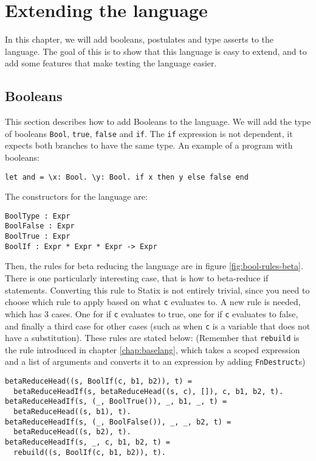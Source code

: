 \chapter{\label{chap:bools}Extending the language}

In this chapter, we will add booleans, postulates and type asserts to the language. The goal of this is to show that this language is easy to extend, and to add some features that make testing the language easier.

\section{Booleans}

This section describes how to add Booleans to the language. We will add the type of booleans \verb|Bool|, \verb|true|, \verb|false| and \verb|if|. The \verb|if| expression is not dependent, it expects both branches to have the same type. An example of a program with booleans: 

\begin{lstlisting}
let and = \x: Bool. \y: Bool. if x then y else false end
\end{lstlisting}
The constructors for the language are:

\begin{lstlisting}
BoolType : Expr
BoolFalse : Expr
BoolTrue : Expr
BoolIf : Expr * Expr * Expr -> Expr
\end{lstlisting}
Then, the rules for beta reducing the language are in figure \ref{fig:bool-rules-beta}. There is one particularly interesting case, that is how to beta-reduce if statements. Converting this rule to Statix is not entirely trivial, since you need to choose which rule to apply based on what \verb|c| evaluates to. A new rule is needed, which has 3 cases. One for if \verb|c| evaluates to true, one for if \verb|c| evaluates to false, and finally a third case for other cases (such as when \verb|c| is a variable that does not have a substitution). These rules are stated below: (Remember that \verb|rebuild| is the rule introduced in chapter \ref{chap:baselang}, which takes a scoped expression and a list of arguments and converts it to an expression by adding \verb|FnDestruct|s)

\begin{lstlisting}
betaReduceHead((s, BoolIf(c, b1, b2)), t) = 
  betaReduceHeadIf(s, betaReduceHead((s, c), []), c, b1, b2, t).
betaReduceHeadIf(s, (_, BoolTrue()), _, b1, _, t) = 
  betaReduceHead((s, b1), t).
betaReduceHeadIf(s, (_, BoolFalse()), _, _, b2, t) = 
  betaReduceHead((s, b2), t).
betaReduceHeadIf(s, _, c, b1, b2, t) = 
  rebuild((s, BoolIf(c, b1, b2)), t).
\end{lstlisting}


